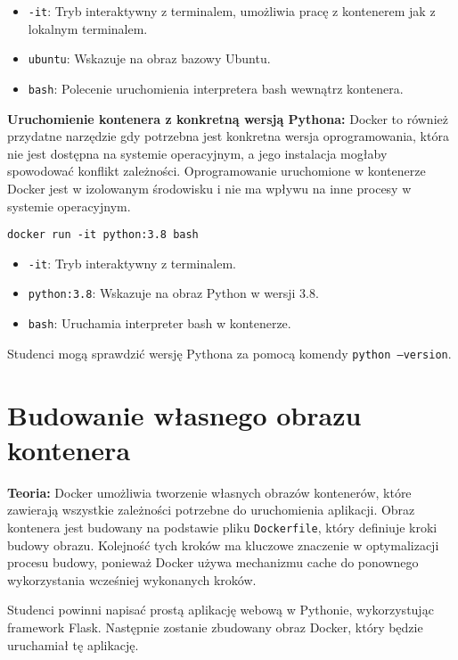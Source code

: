 \documentclass{article}
\begin{document}
\begin{itemize}
    \item \texttt{-it}: Tryb interaktywny z terminalem, umożliwia pracę z kontenerem jak z lokalnym terminalem.
    \item \texttt{ubuntu}: Wskazuje na obraz bazowy Ubuntu.
    \item \texttt{bash}: Polecenie uruchomienia interpretera bash wewnątrz kontenera.
\end{itemize}

\textbf{Uruchomienie kontenera z konkretną wersją Pythona:}
Docker to również przydatne narzędzie gdy potrzebna jest konkretna wersja oprogramowania, która nie jest dostępna na systemie operacyjnym, a jego instalacja mogłaby spowodować konflikt zależności. Oprogramowanie uruchomione w kontenerze Docker jest w izolowanym środowisku i nie ma wpływu na inne procesy w systemie operacyjnym. 

\noindent\begin{lstlisting}
docker run -it python:3.8 bash
\end{lstlisting}

\begin{itemize}
    \item \texttt{-it}: Tryb interaktywny z terminalem.
    \item \texttt{python:3.8}: Wskazuje na obraz Python w wersji 3.8.
    \item \texttt{bash}: Uruchamia interpreter bash w kontenerze.
\end{itemize}

Studenci mogą sprawdzić wersję Pythona za pomocą komendy \texttt{python --version}.

\section{Budowanie własnego obrazu kontenera}

\textbf{Teoria:}  
Docker umożliwia tworzenie własnych obrazów kontenerów, które zawierają wszystkie zależności potrzebne do uruchomienia aplikacji. Obraz kontenera jest budowany na podstawie pliku \texttt{Dockerfile}, który definiuje kroki budowy obrazu. Kolejność tych kroków ma kluczowe znaczenie w optymalizacji procesu budowy, ponieważ Docker używa mechanizmu cache do ponownego wykorzystania wcześniej wykonanych kroków.

Studenci powinni napisać prostą aplikację webową w Pythonie, wykorzystując framework Flask. Następnie zostanie zbudowany obraz Docker, który będzie uruchamiał tę aplikację.
\end{document}
